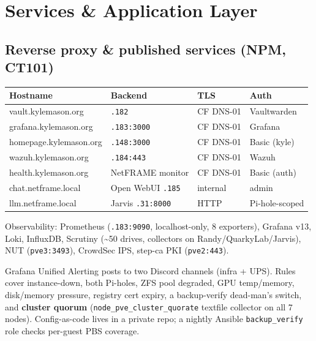 \documentclass[11pt,letterpaper]{article}
\newcommand{\ip}[1]{\texttt{#1}}
\begin{document}
\section{Services \& Application Layer}
\subsection{Reverse proxy \& published services (NPM, CT101)}
\begin{center}\footnotesize
\begin{tabularx}{\textwidth}{@{}l l l X@{}}
\toprule Hostname & Backend & TLS & Auth \\ \midrule
vault.kylemason.org & \ip{.182} & CF DNS-01 & Vaultwarden \\
grafana.kylemason.org & \ip{.183:3000} & CF DNS-01 & Grafana \\
homepage.kylemason.org & \ip{.148:3000} & CF DNS-01 & Basic (kyle) \\
wazuh.kylemason.org & \ip{.184:443} & CF DNS-01 & Wazuh \\
health.kylemason.org & NetFRAME monitor & CF DNS-01 & Basic (auth) \\
chat.netframe.local & Open WebUI \ip{.185} & internal & admin \\
llm.netframe.local & Jarvis \ip{.31:8000} & HTTP & Pi-hole-scoped \\
\bottomrule
\end{tabularx}
\end{center}
Observability: Prometheus (\ip{.183:9090}, localhost-only, 8 exporters), Grafana v13, Loki, InfluxDB, Scrutiny (\textasciitilde50 drives, collectors on Randy/QuarkyLab/Jarvis), NUT (\ip{pve3:3493}), CrowdSec IPS, step-ca PKI (\ip{pve2:443}).
\begin{note}
Grafana Unified Alerting posts to two Discord channels (infra + UPS). Rules cover instance-down, both Pi-holes, ZFS pool degraded, GPU temp/memory, disk/memory pressure, registry cert expiry, a backup-verify dead-man's switch, and \textbf{cluster quorum} (\texttt{node\_pve\_cluster\_quorate} textfile collector on all 7 nodes). Config-as-code lives in a private repo; a nightly Ansible \texttt{backup\_verify} role checks per-guest PBS coverage.
\end{note}

\end{document}
